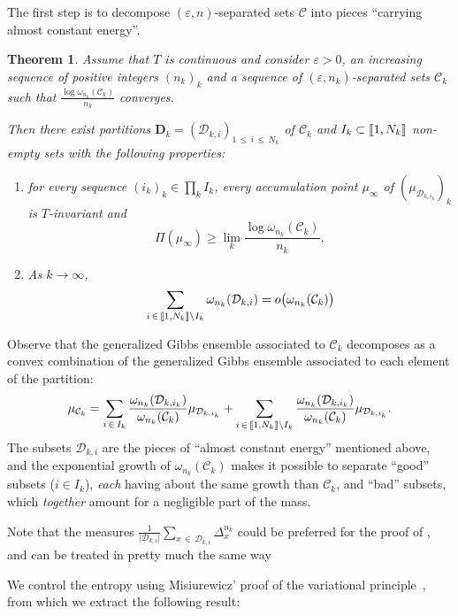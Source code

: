 \documentclass[10pt]{amsart}
\newtheorem{theo}{Theorem}[section]
\theoremstyle{definition}\newtheorem{defi}[theo]{Definition}\newtheorem{rema}[theo]{Remark}\newtheorem{exam}[theo]{Example}\newtheorem{exem}[theo]{Example}\newtheorem{nota}[theo]{Notation}
\theoremstyle{plain}
\theoremstyle{plain}
\newcommand\NLP{\Pi}
\newcounter{In}
\newcommand{\Inref}[1]{\Circled{\ref{#1}}}
\newcommand*\8{\infty}
\newcommand{\cD}{\mathcal{D}}
\newcommand{\cC}{\mathcal C}
\newcommand{\bfD}{\mathbf{D}}
\newcommand{\llbracket}{\mathopen{[\mkern -2.7mu[}}
\newcommand{\rrbracket}{\mathclose{]\mkern -2.7mu]}}
\newcommand*{\romanenumi}{\renewcommand*{\theenumi}{\roman{enumi}}}
\begin{document}
The first step is to decompose $(\varepsilon,n)$-separated sets $\cC$ into pieces ``carrying almost constant energy''.

\begin{theo}\label{thm-Gibbs}
Assume that $T$ is continuous and consider $\varepsilon>0$, an increasing sequence of positive integers $(n_k)_k$ and a sequence of $(\varepsilon,n_k)$-separated sets $\cC_k$ such that $\frac{\log \omega_{n_k}(\cC_k)}{n_k}$ converges.

Then there exist partitions $\bfD_k=(\cD_{k,i})_{1\,\le\,i\,\le\,N_k}$ of $\cC_k$ and $I_k\subset \llbracket 1,N_k\rrbracket$ non-empty sets with the following properties:
\begin{enumerate}\romanenumi
\item\label{enumi-Gibbs-i}
for every sequence $(i_k)_k \in\prod_k I_k$, every accumulation point $\mu_\infty$ of $(\mu_{\cD_{k,i_k}})_k$ is $T$-invariant and
\[
\NLP(\mu_\infty) \ge \lim_k \frac{\log \omega_{n_k}(\cC_k)}{n_k},
\]
\item\label{enumi-Gibbs-ii}
As $k\to\infty$,
\[
\sum_{i\,\in\,\llbracket 1,N_k\rrbracket\setminus I_k} \omega_{n_k}(\cD_{k,i}) = o\big(\omega_{n_k}(\cC_k) \big)
\]
\end{enumerate}
\end{theo}

Observe that the generalized Gibbs ensemble associated to $\cC_k$ decomposes as a convex combination of the generalized Gibbs ensemble associated to each element of the partition:
\[
\mu_{\cC_k} = \sum_{i\,\in\,I_k} \frac{\omega_{n_k}(\cD_{k,i_k})}{\omega_{n_k}(\cC_k)} \mu_{\cD_{k,i_k}} + \sum_{i\,\in\,\llbracket 1,N_k\rrbracket\setminus I_k} \frac{\omega_{n_k}(\cD_{k,i_k})}{\omega_{n_k}(\cC_k)} \mu_{\cD_{k,i_k}}.
\]
The subsets $\cD_{k,i}$ are the pieces of ``almost constant energy'' mentioned above, and the exponential growth of $\omega_{n_k}(\cC_k)$ makes it possible to separate ``good'' subsets ($i\in I_k$), \emph{each} having about the same growth than $\cC_k$, and ``bad'' subsets, which \emph{together} amount for a negligible part of the mass.

Note that the measures $\frac{1}{\lvert \cD_{k,i} \rvert} \sum_{x\,\in\,\cD_{k,i}} \Delta_x^{n_k}$ could be preferred for the proof of \Inref{In:3}, and can be treated in pretty much the same way


We control the entropy using Misiurewicz' proof of the variational principle~\cite{Misiurewicz-VP}, from which we extract the following result:
\end{document}
